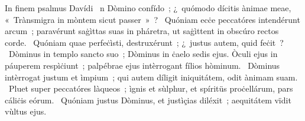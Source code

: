 { In finem psalmus Davídi}
{%
~n Dòmino confído~; ¿~quómodo dícitis ànimae meae, «~Trànsmigra in mòntem sicut passer~»~?
~Quóniam ecċe peccatóres intendérunt arcum~; paravérunt saġìttas suas in pháretra, ut saġìttent in obscúro rectos corde.
~Quóniam quae perfeċìsti, destruxérunt~; ¿~justus autem, quid feċit~?
~Dòminus in templo sancto suo~; Dòminus in ċaelo sedis ejus. Òculi ejus in páuperem respìċiunt~; palpébrae ejus intèrrogant fílios hòminum.
~Dòminus intèrrogat justum et ìmpium~; qui autem díligit iniquitátem, odit ànimam suam.
~Pluet super peccatóres làqueos~; ìgnis et sùlphur, et spíritüs proċellárum, pars cáliċis eórum.
~Quóniam justus Dòminus, et justìçias diléxit~; aequitátem vïdit vùltus ejus.
}
